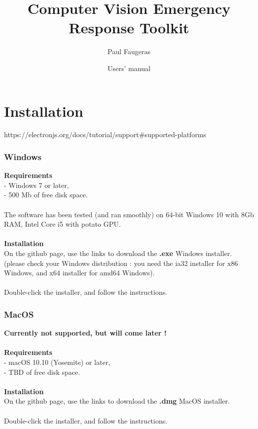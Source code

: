 \documentclass[12pt,a4paper]{article}
\author{Paul Faugeras}
\date{Users' manual}
\title{Computer Vision Emergency Response Toolkit}
\begin{document}
\pagebreak

\begin{LARGE}
	\maketitle
\end{LARGE}

\pagebreak

\tableofcontents

\pagebreak

\part{Installation}

https://electronjs.org/docs/tutorial/support\#supported-platforms

\section{Windows}
\textbf{Requirements}\\
- Windows 7 or later,\\
- 500 Mb of free disk space.\\
~\\
The software has been tested (and ran smoothly) on 64-bit Windows 10 with 8Gb RAM, Intel Core i5 with potato GPU.\\
~\\
\textbf{Installation}\\
On the github page, use the links to download the \textbf{.exe} Windows installer. (please check your Windows distribution : you need the ia32 installer for x86 Windows, and x64 installer for amd64 Windows).\\
~\\
Double-click the installer, and follow the instructions.

\section{MacOS}
\textbf{Currently not supported, but will come later !}\\
~\\
\textbf{Requirements}\\
- macOS 10.10 (Yosemite) or later,\\
- TBD of free disk space.\\
~\\
\textbf{Installation}\\
On the github page, use the links to download the \textbf{.dmg} MacOS installer.\\
~\\
Double-click the installer, and follow the instructions.
\end{document}
